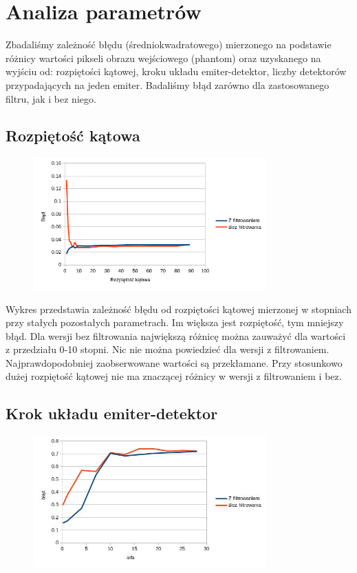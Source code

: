 \documentclass{article}
\begin{document}
\newpage
\section{Analiza parametrów}

Zbadaliśmy zależność błędu (średniokwadratowego) mierzonego na podstawie różnicy wartości pikseli obrazu wejściowego (phantom) oraz uzyskanego na wyjściu od: rozpiętości kątowej, kroku układu emiter-detektor, liczby detektorów przypadających na jeden emiter. Badaliśmy błąd zarówno dla zastosowanego filtru, jak i bez niego.

\subsection{Rozpiętość kątowa}
\begin{figure}[H]
\begin{center}
\includegraphics[width=0.8\textwidth]{./width.png}
\end{center}
\end{figure}

Wykres przedstawia zależność błędu od rozpiętości kątowej mierzonej w stopniach przy stałych pozostałych parametrach. Im większa jest rozpiętość, tym mniejszy błąd. Dla wersji bez filtrowania największą różnicę można zauważyć dla wartości z przedziału 0-10 stopni. Nic nie można powiedzieć dla wersji z filtrowaniem. Najprawdopodobniej zaobserwowane wartości są przekłamane. Przy stosunkowo dużej rozpiętość kątowej nie ma znaczącej różnicy w wersji z filtrowaniem i bez. 

\subsection{Krok układu emiter-detektor}
\begin{figure}[H]
\begin{center}
\includegraphics[width=0.8\textwidth]{./alpha.jpg}
\end{center}
\end{figure}
\end{document}
